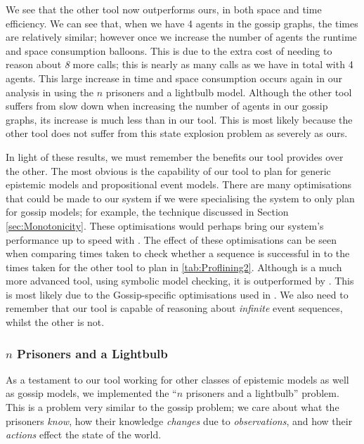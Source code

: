 \documentclass[ %
                    author={Leo Poulson},
                supervisor={Dr. Steven Ramsay},
                    degree={BSc},
                     title={Epistemic Planning for the Dynamic Gossip problem},
                  subtitle={},
                      year={2019} ]{dissertation}
\begin{document}
We see that the other tool now outperforms ours, in both space and time
efficiency. We can see that, when we have 4 agents in the gossip graphs, the
times are relatively similar; however once we increase the number of agents the
runtime and space consumption balloons. This is due to the extra cost of needing
to reason about \emph{8} more calls; this is nearly as many calls as we have in
total with 4 agents. This large increase in time and space consumption occurs
again in our analysis in using the $n$ prisoners and a lightbulb model. Although
the other tool suffers from slow down when increasing the number of agents in
our gossip graphs, its increase is much less than in our tool. This is most
likely because the other tool does not suffer from this state explosion problem
as severely as ours. 

In light of these results, we must remember the benefits our tool provides over
the other. The most obvious is the capability of our tool to plan for generic
epistemic models and propositional event models. There are many optimisations
that could be made to our system if we were specialising the system to only plan
for gossip models; for example, the technique discussed in Section
\ref{sec:Monotonicity}. These optimisations would perhaps bring our system's
performance up to speed with \cite{GithubGossip}. The effect of these
optimisations can be seen when comparing times taken to check whether a sequence
is successful in \cite{SMCDEL} to the times taken for the other tool to plan in
\ref{tab:Proflining2}. Although \cite{SMCDEL} is a much more advanced tool,
using symbolic model checking, it is outperformed by \cite{GithubGossip}. This
is most likely due to the Gossip-specific optimisations used in
\cite{GithubGossip}. We also need to remember that our tool is capable of
reasoning about \emph{infinite} event sequences, whilst the other is not. 

\subsubsection{$n$ Prisoners and a Lightbulb}
\label{sec:Prisoners}

As a testament to our tool working for other classes of epistemic models as well
as gossip models, we implemented the ``$n$ prisoners and a lightbulb'' problem.
This is a problem very similar to the gossip problem; we care about what the
prisoners \emph{know}, how their knowledge \emph{changes} due to
\emph{observations}, and how their \emph{actions} effect the state of the world. 
\end{document}
